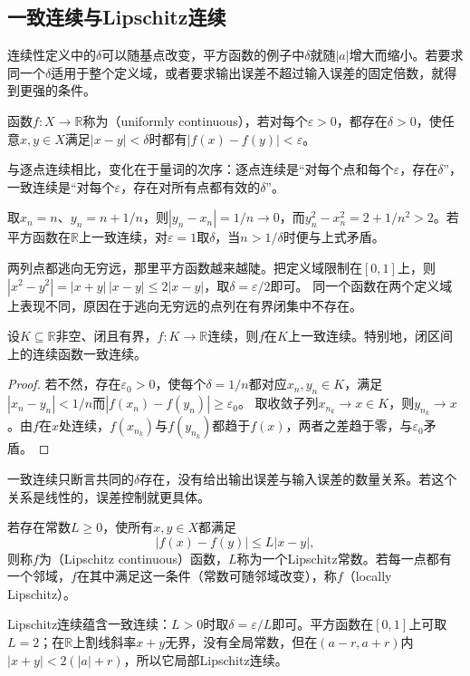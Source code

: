 \subsection{一致连续与Lipschitz连续}
\label{sec:ru-uniform-lipschitz}
\label{sec:analysis-continuity-relations}

连续性定义中的$\delta$可以随基点改变，平方函数的例子中$\delta$就随$|a|$增大而缩小。若要求同一个$\delta$适用于整个定义域，或者要求输出误差不超过输入误差的固定倍数，就得到更强的条件。
\begin{definition}[一致连续]
\label{def:analysis-uniform-continuity}
函数$f:X\to\mathbb R$称为（uniformly continuous），若对每个$\varepsilon>0$，都存在$\delta>0$，使任意$x,y\in X$满足$|x-y|<\delta$时都有$|f(x)-f(y)|<\varepsilon$。
\end{definition}
与逐点连续相比，变化在于量词的次序：逐点连续是“对每个点和每个$\varepsilon$，存在$\delta$”，一致连续是“对每个$\varepsilon$，存在对所有点都有效的$\delta$”。
\begin{example}[平方函数在实轴上不一致连续]
\label{ex:analysis-square-not-uniformly-continuous}
取$x_n=n$、$y_n=n+1/n$，则$|y_n-x_n|=1/n\to0$，而$y_n^2-x_n^2=2+1/n^2>2$。若平方函数在$\mathbb R$上一致连续，对$\varepsilon=1$取$\delta$，当$n>1/\delta$时便与上式矛盾。
\end{example}
两列点都逃向无穷远，那里平方函数越来越陡。把定义域限制在$[0,1]$上，则$|x^2-y^2|=|x+y|\,|x-y|\leq2|x-y|$，取$\delta=\varepsilon/2$即可。
同一个函数在两个定义域上表现不同，原因在于逃向无穷远的点列在有界闭集中不存在。
\begin{theorem}[一致连续性定理]
\label{thm:analysis-uniform-continuity}
设$K\subseteq\mathbb R$非空、闭且有界，$f:K\to\mathbb R$连续，则$f$在$K$上一致连续。特别地，闭区间上的连续函数一致连续。
\end{theorem}
\begin{proof}
若不然，存在$\varepsilon_0>0$，使每个$\delta=1/n$都对应$x_n,y_n\in K$，满足$|x_n-y_n|<1/n$而$|f(x_n)-f(y_n)|\geq\varepsilon_0$。
取收敛子列$x_{n_k}\to x\in K$，则$y_{n_k}\to x$。由$f$在$x$处连续，$f(x_{n_k})$与$f(y_{n_k})$都趋于$f(x)$，两者之差趋于零，与$\varepsilon_0$矛盾。
\end{proof}

一致连续只断言共同的$\delta$存在，没有给出输出误差与输入误差的数量关系。若这个关系是线性的，误差控制就更具体。
\begin{definition}[Lipschitz连续]
\label{def:analysis-lipschitz-continuity}
若存在常数$L\geq0$，使所有$x,y\in X$都满足
\begin{equation}
 |f(x)-f(y)|\leq L|x-y|,
 \label{eq:analysis-lipschitz-condition}
\end{equation}
则称$f$为（Lipschitz continuous）函数，$L$称为一个Lipschitz常数。若每一点都有一个邻域，$f$在其中满足这一条件（常数可随邻域改变），称$f$（locally Lipschitz）。
\end{definition}
Lipschitz连续蕴含一致连续：$L>0$时取$\delta=\varepsilon/L$即可。平方函数在$[0,1]$上可取$L=2$；在$\mathbb R$上割线斜率$x+y$无界，没有全局常数，但在$(a-r,a+r)$内$|x+y|<2(|a|+r)$，所以它局部Lipschitz连续。


